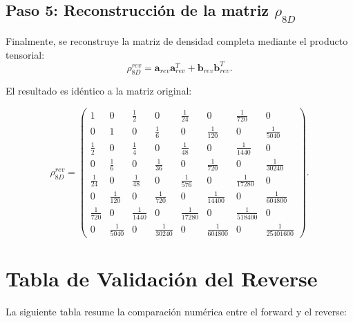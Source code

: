 \documentclass[12pt,a4paper]{article}
\begin{document}
\subsection{Paso 5: Reconstrucción de la matriz \(\rho_{8D}\)}
Finalmente, se reconstruye la matriz de densidad completa mediante el producto tensorial:
\[
\rho_{8D}^{rev} = \mathbf{a}_{rev} \mathbf{a}_{rev}^T + \mathbf{b}_{rev} \mathbf{b}_{rev}^T.
\]

El resultado es idéntico a la matriz original:

\[
\rho_{8D}^{rev} =
\begin{pmatrix}
1 & 0 & \frac{1}{2} & 0 & \frac{1}{24} & 0 & \frac{1}{720} & 0 \\
0 & 1 & 0 & \frac{1}{6} & 0 & \frac{1}{120} & 0 & \frac{1}{5040} \\
\frac{1}{2} & 0 & \frac{1}{4} & 0 & \frac{1}{48} & 0 & \frac{1}{1440} & 0 \\
0 & \frac{1}{6} & 0 & \frac{1}{36} & 0 & \frac{1}{720} & 0 & \frac{1}{30240} \\
\frac{1}{24} & 0 & \frac{1}{48} & 0 & \frac{1}{576} & 0 & \frac{1}{17280} & 0 \\
0 & \frac{1}{120} & 0 & \frac{1}{720} & 0 & \frac{1}{14400} & 0 & \frac{1}{604800} \\
\frac{1}{720} & 0 & \frac{1}{1440} & 0 & \frac{1}{17280} & 0 & \frac{1}{518400} & 0 \\
0 & \frac{1}{5040} & 0 & \frac{1}{30240} & 0 & \frac{1}{604800} & 0 & \frac{1}{25401600}
\end{pmatrix}.
\]

\section{Tabla de Validación del Reverse}

La siguiente tabla resume la comparación numérica entre el forward y el reverse:
\end{document}
